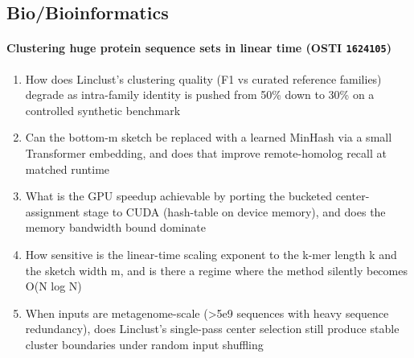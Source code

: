 \documentclass[11pt]{article}
\begin{document}
\subsection*{Bio/Bioinformatics}
\paragraph{Clustering huge protein sequence sets in linear time \textnormal{\small(OSTI \texttt{1624105})}}
\begin{enumerate}[leftmargin=1.6em,itemsep=0.2em,topsep=0.2em,label=Q\arabic*.]
\item How does Linclust's clustering quality (F1 vs curated reference families) degrade as intra-family identity is pushed from 50\% down to 30\% on a controlled synthetic benchmark
\item Can the bottom-m sketch be replaced with a learned MinHash via a small Transformer embedding, and does that improve remote-homolog recall at matched runtime
\item What is the GPU speedup achievable by porting the bucketed center-assignment stage to CUDA (hash-table on device memory), and does the memory bandwidth bound dominate
\item How sensitive is the linear-time scaling exponent to the k-mer length k and the sketch width m, and is there a regime where the method silently becomes O(N log N)
\item When inputs are metagenome-scale (\textgreater{}5e9 sequences with heavy sequence redundancy), does Linclust's single-pass center selection still produce stable cluster boundaries under random input shuffling
\end{enumerate}
\end{document}
